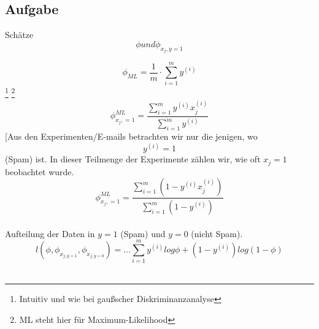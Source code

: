\subsection{Aufgabe }

Schätze \[ \phi und \phi_{x_j,y=1} \]

\[ \phi_{ML} = \frac{1}{m} \cdot \sum_{i=1}^{m} y^{(i)} \]\footnote{Intuitiv und wie bei gaußscher Diskriminanzanalyse}
\footnote{ML steht hier für Maximum-Likelihood} \\

\[ \phi_{x_j,=1}^{ML} = \frac{\sum_{i=1}^{m} y^{(i)}x_{j}^{(i)} }{\sum_{i=1}^{m} y^{(i)}} \] [Aus den Experimenten/E-mails betrachten wir nur die jenigen, wo \[ y^{(i)} = 1 \] (Spam) ist. In dieser Teilmenge der Experimente zählen wir, wie oft $x_j = 1$ beobachtet wurde.\\

\[ \phi_{x_j,=1}^{ML} = \frac{ \sum_{i=1}^{m}( 1 - y^{(i)}x_{j}^{(i)} ) }{ \sum_{i=1}^{m}( 1 - y^{(i)} ) } \] \\
Aufteilung der Daten in $y=1$ (Spam) und $y=0$ (nicht Spam).\\

\[ l(\phi, \phi_{x_{j,y=1}},  \phi_{x_{j,y=0}}) = ...  \sum_{i=1}^{m} y^{(i)} log\phi + (1 - y^{(i)}) log(1 - \phi) \] \\
